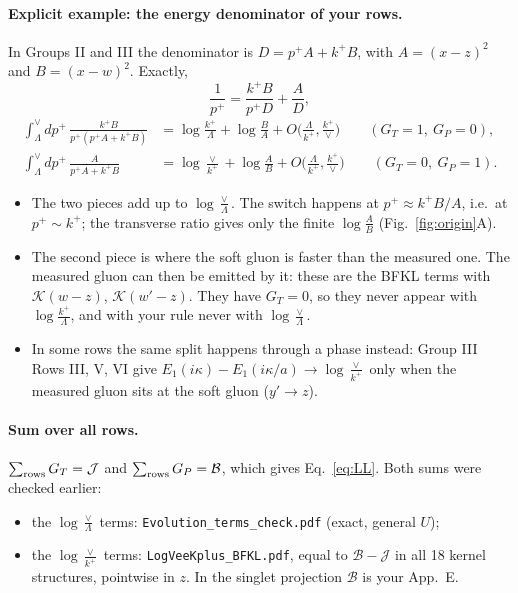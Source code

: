 \documentclass[11pt]{article}
\numberwithin{equation}{section}
\newcommand{\JJ}{\mathcal J}
\newcommand{\BB}{\mathcal B}
\begin{document}
\paragraph{Explicit example: the energy denominator of your rows.} In Groups II and III the denominator is $D=p^+A+k^+B$, with $A=(x-z)^2$ and $B=(x-w)^2$. Exactly,
\begin{equation}
\frac{1}{p^+}=\frac{k^+B}{p^+D}+\frac{A}{D},
\end{equation}
\begin{align}
\int_\Lambda^\vee dp^+\,\frac{k^+B}{p^+(p^+A+k^+B)}&=\log\frac{k^+}{\Lambda}+\log\frac{B}{A}+O\Big(\frac{\Lambda}{k^+},\frac{k^+}{\vee}\Big)\qquad(G_T=1,\ G_P=0),\\
\int_\Lambda^\vee dp^+\,\frac{A}{p^+A+k^+B}&=\log\frac{\vee}{k^+}+\log\frac{A}{B}+O\Big(\frac{\Lambda}{k^+},\frac{k^+}{\vee}\Big)\qquad(G_T=0,\ G_P=1).
\end{align}
\begin{itemize}
\item The two pieces add up to $\log\frac\vee\Lambda$. The switch happens at $p^+\approx k^+B/A$, i.e.\ at $p^+\sim k^+$; the transverse ratio gives only the finite $\log\frac AB$ (Fig.~\ref{fig:origin}A).
\item The second piece is where the soft gluon is faster than the measured one. The measured gluon can then be emitted by it: these are the BFKL terms with $\mathcal K(w-z)$, $\mathcal K(w'-z)$. They have $G_T=0$, so they never appear with $\log\frac{k^+}{\Lambda}$, and with your rule never with $\log\frac\vee\Lambda$.
\item In some rows the same split happens through a phase instead: Group III Rows III, V, VI give $E_1(i\kappa)-E_1(i\kappa/a)\to\log\frac{\vee}{k^+}$ only when the measured gluon sits at the soft gluon ($y'\to z$).
\end{itemize}

\paragraph{Sum over all rows.} $\sum_{\rm rows}G_T=\JJ$ and $\sum_{\rm rows}G_P=\BB$, which gives Eq.~\eqref{eq:LL}. Both sums were checked earlier:
\begin{itemize}
\item the $\log\frac\vee\Lambda$ terms: \texttt{Evolution\_terms\_check.pdf} (exact, general $U$);
\item the $\log\frac{\vee}{k^+}$ terms: \texttt{LogVeeKplus\_BFKL.pdf}, equal to $\BB-\JJ$ in all 18 kernel structures, pointwise in $z$. In the singlet projection $\BB$ is your App.~E.
\end{itemize}
\end{document}
